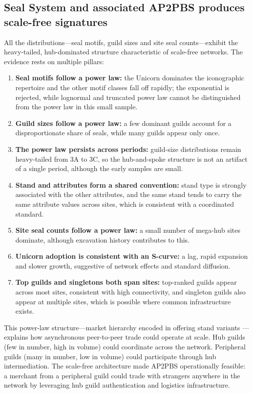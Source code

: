\documentclass[12pt]{article}
\begin{document}
\subsection{Seal System and associated AP2PBS produces scale-free signatures}

All the distributions---seal motifs, guild sizes and site seal counts---exhibit
the heavy-tailed, hub-dominated structure characteristic of scale-free networks.
The evidence rests on multiple pillars:

\begin{enumerate}
    \item \textbf{Seal motifs follow a power law:} the Unicorn dominates the
    iconographic repertoire and the other motif classes fall off rapidly; the
    exponential is rejected, while lognormal and truncated power law cannot be
    distinguished from the power law in this small sample.
    \item \textbf{Guild sizes follow a power law:} a few dominant guilds account for
    a disproportionate share of seals, while many guilds appear only once.
    \item \textbf{The power law persists across periods:} guild-size distributions
    remain heavy-tailed from 3A to 3C, so the hub-and-spoke structure is not an
    artifact of a single period, although the early samples are small.
    \item \textbf{Stand and attributes form a shared convention:} stand type is
    strongly associated with the other attributes, and the same stand tends to carry
    the same attribute values across sites, which is consistent with a coordinated
    standard.
    \item \textbf{Site seal counts follow a power law:} a small number of mega-hub
    sites dominate, although excavation history contributes to this.
    \item \textbf{Unicorn adoption is consistent with an S-curve:} a lag, rapid
    expansion and slower growth, suggestive of network effects and standard
    diffusion.
    \item \textbf{Top guilds and singletons both span sites:} top-ranked guilds
    appear across most sites, consistent with high connectivity, and singleton guilds
    also appear at multiple sites, which is possible where common infrastructure
    exists.
\end{enumerate}

This power-law structure---market hierarchy encoded in offering stand variants
---explains how asynchronous peer-to-peer trade could operate at scale. Hub
guilds (few in number, high in volume) could coordinate across the network.
Peripheral guilds (many in number, low in volume) could participate through hub
intermediation. The scale-free architecture made AP2PBS operationally feasible:
a merchant from a peripheral guild could trade with strangers anywhere in the
network by leveraging hub guild authentication and logistics infrastructure.
\end{document}

